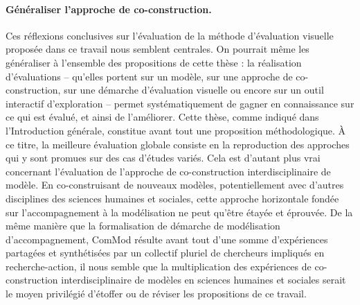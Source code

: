 \paragraph{Généraliser l'approche de co-construction.}
Ces réflexions conclusives sur l'évaluation de la méthode d'évaluation visuelle proposée dans ce travail nous semblent centrales.
On pourrait même les généraliser à l'ensemble des propositions de cette thèse :
	la réalisation d'évaluations -- qu'elles portent sur un modèle, sur une approche de co-construction, sur une démarche d'évaluation visuelle ou encore sur un outil interactif d'exploration -- permet systématiquement de gagner en connaissance sur ce qui est évalué, et ainsi de l'améliorer.
Cette thèse, comme indiqué dans l'Introduction générale, constitue avant tout une proposition méthodologique.
À ce titre, la meilleure évaluation globale consiste en la reproduction des approches qui y sont promues sur des cas d'études variés.
Cela est d'autant plus vrai concernant l'évaluation de l'approche de co-construction interdisciplinaire de modèle.
En co-construisant de nouveaux modèles, potentiellement avec d'autres disciplines des sciences humaines et sociales, cette approche horizontale fondée sur l'accompagnement à la modélisation ne peut qu'être étayée et éprouvée.
De la même manière que la formalisation de démarche de modélisation d'accompagnement, ComMod \autocite{commod_modelisation_2005} résulte avant tout d'une somme d'expériences partagées et synthétisées par un collectif pluriel de chercheurs impliqués en recherche-action, il nous semble que la multiplication des expériences de co-construction interdisciplinaire de modèles en sciences humaines et sociales serait le moyen privilégié d'étoffer ou de réviser les propositions de ce travail.